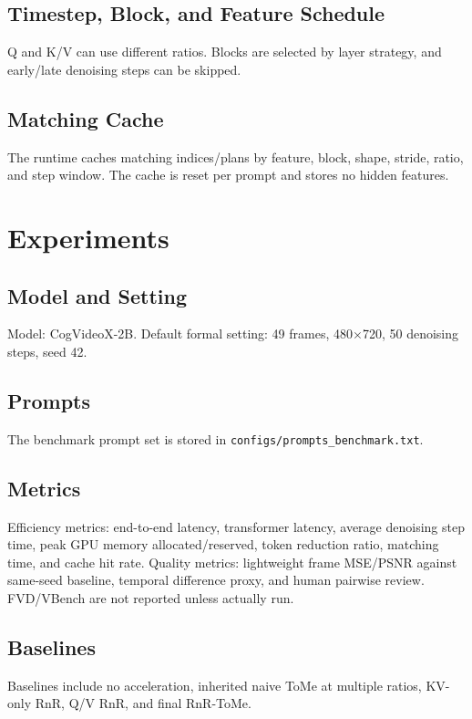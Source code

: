 \documentclass{article}
\begin{document}
\subsection{Timestep, Block, and Feature Schedule}
Q and K/V can use different ratios.
Blocks are selected by layer strategy, and early/late denoising steps can be skipped.

\subsection{Matching Cache}
The runtime caches matching indices/plans by feature, block, shape, stride, ratio, and step window.
The cache is reset per prompt and stores no hidden features.

\section{Experiments}
\subsection{Model and Setting}
Model: CogVideoX-2B. Default formal setting: 49 frames, 480$\times$720, 50 denoising steps, seed 42.

\subsection{Prompts}
The benchmark prompt set is stored in \texttt{configs/prompts\_benchmark.txt}.

\subsection{Metrics}
Efficiency metrics: end-to-end latency, transformer latency, average denoising step time, peak GPU memory allocated/reserved, token reduction ratio, matching time, and cache hit rate.
Quality metrics: lightweight frame MSE/PSNR against same-seed baseline, temporal difference proxy, and human pairwise review.
FVD/VBench are not reported unless actually run.

\subsection{Baselines}
Baselines include no acceleration, inherited naive ToMe at multiple ratios, KV-only RnR, Q/V RnR, and final RnR-ToMe.
\end{document}
